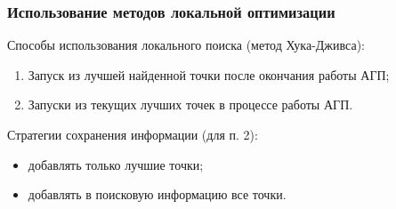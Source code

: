 \documentclass[aspectratio=169]{beamer}
\begin{document}
\begin{frame}
\frametitle{Использование методов локальной оптимизации}
Способы использования локального поиска (метод Хука-Дживса):\
\begin{enumerate}
  \item Запуск из лучшей найденной точки после окончания работы АГП;
  \item Запуски из текущих лучших точек в процессе работы АГП.
\end{enumerate}
\bigbreak
Стратегии сохранения информации (для п. 2):
\begin{itemize}
  \item добавлять только лучшие точки;
  \item добавлять в поисковую информацию все точки.
\end{itemize}
\end{frame}
\end{document}
